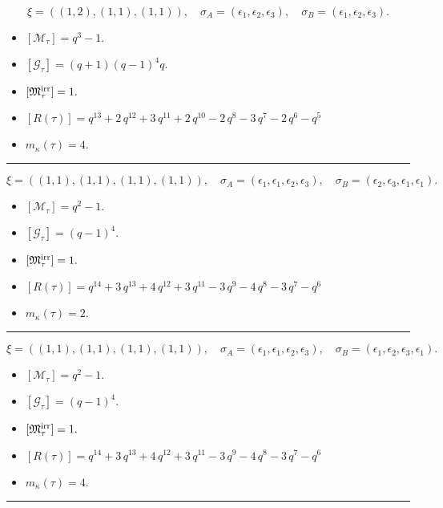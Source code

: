 \documentclass[10pt,a4paper]{amsart}
\begin{document}
$$\xi = ({(1, 2), (1, 1)}, {(1, 1)}),\quad \sigma_A = ({{\epsilon_1}, {\epsilon_2}}, {{\epsilon_3}}),\quad \sigma_B = ({{\epsilon_1}, {\epsilon_2}}, {{\epsilon_3}}).$$

\begin{itemize}
 \item $[\mathcal{M}_{\tau}] = q^{3} - 1 .$

 \item $[\mathcal{G}_{\tau}] = {\left(q + 1\right)} {\left(q - 1\right)}^{4} q .$

 \item $[{\frak M}_{\tau}^{\textrm{irr}}] = 1 .$

 \item $[R(\tau)] = q^{13} + 2 \, q^{12} + 3 \, q^{11} + 2 \, q^{10} - 2 \, q^{8} - 3 \, q^{7} - 2 \, q^{6} - q^{5} $

 \item $m_{\kappa}(\tau) = 4 .$

 \end{itemize}
\noindent\rule{8cm}{0.4pt}

$$\xi = ({(1, 1), (1, 1), (1, 1)}, {(1, 1)}),\quad \sigma_A = ({{\epsilon_1}, {\epsilon_1}, {\epsilon_2}}, {{\epsilon_3}}),\quad \sigma_B = ({{\epsilon_2}, {\epsilon_3}, {\epsilon_1}}, {{\epsilon_1}}).$$

\begin{itemize}
 \item $[\mathcal{M}_{\tau}] = q^{2} - 1 .$

 \item $[\mathcal{G}_{\tau}] = {\left(q - 1\right)}^{4} .$

 \item $[{\frak M}_{\tau}^{\textrm{irr}}] = 1 .$

 \item $[R(\tau)] = q^{14} + 3 \, q^{13} + 4 \, q^{12} + 3 \, q^{11} - 3 \, q^{9} - 4 \, q^{8} - 3 \, q^{7} - q^{6} $

 \item $m_{\kappa}(\tau) = 2 .$

 \end{itemize}
\noindent\rule{8cm}{0.4pt}

$$\xi = ({(1, 1), (1, 1), (1, 1)}, {(1, 1)}),\quad \sigma_A = ({{\epsilon_1}, {\epsilon_1}, {\epsilon_2}}, {{\epsilon_3}}),\quad \sigma_B = ({{\epsilon_1}, {\epsilon_2}, {\epsilon_3}}, {{\epsilon_1}}).$$

\begin{itemize}
 \item $[\mathcal{M}_{\tau}] = q^{2} - 1 .$

 \item $[\mathcal{G}_{\tau}] = {\left(q - 1\right)}^{4} .$

 \item $[{\frak M}_{\tau}^{\textrm{irr}}] = 1 .$

 \item $[R(\tau)] = q^{14} + 3 \, q^{13} + 4 \, q^{12} + 3 \, q^{11} - 3 \, q^{9} - 4 \, q^{8} - 3 \, q^{7} - q^{6} $

 \item $m_{\kappa}(\tau) = 4 .$

 \end{itemize}
\noindent\rule{8cm}{0.4pt}
\end{document}
